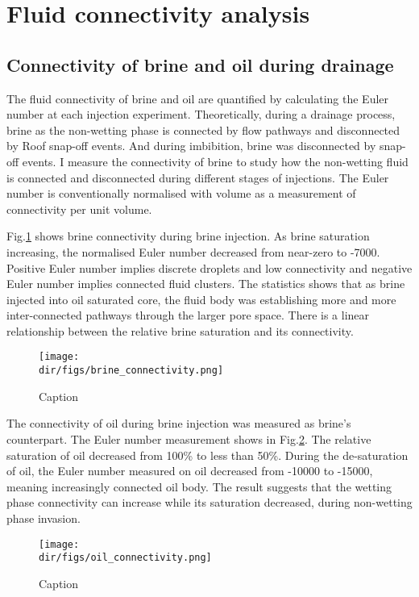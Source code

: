 \section{Fluid connectivity analysis}
\subsection{Connectivity of brine and oil during drainage}
The fluid connectivity of brine and oil are quantified by calculating the Euler number at each injection experiment. Theoretically, during a drainage process, brine as the non-wetting phase is connected by flow pathways and disconnected by Roof snap-off events. And during imbibition, brine was disconnected by snap-off events. I measure the connectivity of brine to study how the non-wetting fluid is connected and disconnected during different stages of injections. The Euler number is conventionally normalised with volume as a measurement of connectivity per unit volume.

Fig.\ref{brine_connectivity} shows brine connectivity during brine injection. As brine saturation increasing, the normalised Euler number decreased from near-zero to -7000. Positive Euler number implies discrete droplets and low connectivity and negative Euler number implies connected fluid clusters. The statistics shows that as brine injected into oil saturated core, the fluid body was establishing more and more inter-connected pathways through the larger pore space. There is a linear relationship between the relative brine saturation and its connectivity.

\begin{figure}
    \centering
    \texttt{[image: \\dir/figs/brine\_connectivity.png]}
    \caption{Caption}   
    \label{brine_connectivity}
\end{figure}

The connectivity of oil during brine injection was measured as brine's counterpart. The Euler number measurement shows in Fig.\ref{oil_connectivity}. The relative saturation of oil decreased from 100\% to less than 50\%. During the de-saturation of oil, the Euler number measured on oil decreased from -10000 to -15000, meaning increasingly connected oil body. The result suggests that the wetting phase connectivity can increase while its saturation decreased, during non-wetting phase invasion. 

\begin{figure}
    \centering
    \texttt{[image: \\dir/figs/oil\_connectivity.png]}
    \caption{Caption}   
    \label{oil_connectivity}
\end{figure}

